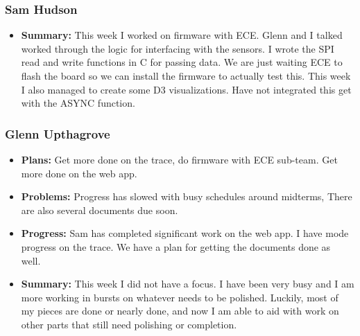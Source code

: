 \documentclass[onecolumn, draftclsnofoot,10pt, compsoc]{IEEEtran}
\begin{document}
\subsubsection{Sam Hudson}
\begin {itemize}
\item \textbf{Summary: }This week I worked on firmware with ECE. Glenn and I talked worked through the logic for interfacing with the sensors. I wrote the SPI read and write functions in C for passing data. We are just waiting ECE to flash the board so we can install the firmware to actually test this. This week I also managed to create some D3 visualizations. Have not integrated this get with the ASYNC function.
\end {itemize}
\subsubsection{Glenn Upthagrove}
\begin {itemize}
 \item \textbf{Plans: }Get more done on the trace, do firmware with ECE sub-team. Get more done on the web app.
 \item \textbf{Problems: }Progress has slowed with busy schedules around midterms, There are also several documents due soon. 
 \item \textbf{Progress: }Sam has completed significant work on the web app. I have mode progress on the trace. We have a plan for getting the documents done as well. 
 \item \textbf{Summary: }This week I did not have a focus. I have been very busy and I am more working in bursts on whatever needs to be polished. Luckily, most of my pieces are done or nearly done, and now I am able to aid with work on other parts that still need polishing or completion. 
\end {itemize}



%
%
\end{document}
